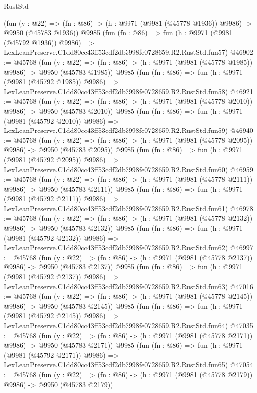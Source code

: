 \begin{lexlean}{RustStd}
\begin{coremodule}
    (fun (y : @22) =>
    (fn : @86) -> (h : @9971 (@9981 (@45778 @1936)) @9986) -> @9950 (@45783 @1936))
    @9985
    (fun (fn : @86) =>
    fun (h : @9971 (@9981 (@45792 @1936)) @9986) =>
    LexLeanPreserve.C1dd80cc43ff53cdf2db3998fe0728659.R2.RustStd.fun57)
@46902 := @45768
    (fun (y : @22) =>
    (fn : @86) -> (h : @9971 (@9981 (@45778 @1985)) @9986) -> @9950 (@45783 @1985))
    @9985
    (fun (fn : @86) =>
    fun (h : @9971 (@9981 (@45792 @1985)) @9986) =>
    LexLeanPreserve.C1dd80cc43ff53cdf2db3998fe0728659.R2.RustStd.fun58)
@46921 := @45768
    (fun (y : @22) =>
    (fn : @86) -> (h : @9971 (@9981 (@45778 @2010)) @9986) -> @9950 (@45783 @2010))
    @9985
    (fun (fn : @86) =>
    fun (h : @9971 (@9981 (@45792 @2010)) @9986) =>
    LexLeanPreserve.C1dd80cc43ff53cdf2db3998fe0728659.R2.RustStd.fun59)
@46940 := @45768
    (fun (y : @22) =>
    (fn : @86) -> (h : @9971 (@9981 (@45778 @2095)) @9986) -> @9950 (@45783 @2095))
    @9985
    (fun (fn : @86) =>
    fun (h : @9971 (@9981 (@45792 @2095)) @9986) =>
    LexLeanPreserve.C1dd80cc43ff53cdf2db3998fe0728659.R2.RustStd.fun60)
@46959 := @45768
    (fun (y : @22) =>
    (fn : @86) -> (h : @9971 (@9981 (@45778 @2111)) @9986) -> @9950 (@45783 @2111))
    @9985
    (fun (fn : @86) =>
    fun (h : @9971 (@9981 (@45792 @2111)) @9986) =>
    LexLeanPreserve.C1dd80cc43ff53cdf2db3998fe0728659.R2.RustStd.fun61)
@46978 := @45768
    (fun (y : @22) =>
    (fn : @86) -> (h : @9971 (@9981 (@45778 @2132)) @9986) -> @9950 (@45783 @2132))
    @9985
    (fun (fn : @86) =>
    fun (h : @9971 (@9981 (@45792 @2132)) @9986) =>
    LexLeanPreserve.C1dd80cc43ff53cdf2db3998fe0728659.R2.RustStd.fun62)
@46997 := @45768
    (fun (y : @22) =>
    (fn : @86) -> (h : @9971 (@9981 (@45778 @2137)) @9986) -> @9950 (@45783 @2137))
    @9985
    (fun (fn : @86) =>
    fun (h : @9971 (@9981 (@45792 @2137)) @9986) =>
    LexLeanPreserve.C1dd80cc43ff53cdf2db3998fe0728659.R2.RustStd.fun63)
@47016 := @45768
    (fun (y : @22) =>
    (fn : @86) -> (h : @9971 (@9981 (@45778 @2145)) @9986) -> @9950 (@45783 @2145))
    @9985
    (fun (fn : @86) =>
    fun (h : @9971 (@9981 (@45792 @2145)) @9986) =>
    LexLeanPreserve.C1dd80cc43ff53cdf2db3998fe0728659.R2.RustStd.fun64)
@47035 := @45768
    (fun (y : @22) =>
    (fn : @86) -> (h : @9971 (@9981 (@45778 @2171)) @9986) -> @9950 (@45783 @2171))
    @9985
    (fun (fn : @86) =>
    fun (h : @9971 (@9981 (@45792 @2171)) @9986) =>
    LexLeanPreserve.C1dd80cc43ff53cdf2db3998fe0728659.R2.RustStd.fun65)
@47054 := @45768
    (fun (y : @22) =>
    (fn : @86) -> (h : @9971 (@9981 (@45778 @2179)) @9986) -> @9950 (@45783 @2179))

\end{coremodule}
\end{lexlean}
